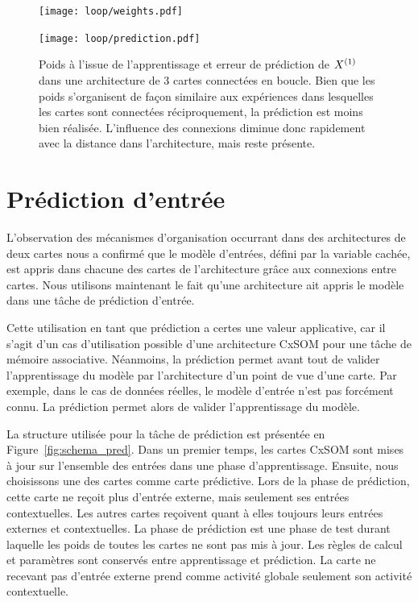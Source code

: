 \documentclass[../main]{subfiles}
\begin{document}
\begin{figure}
	\begin{minipage}{\textwidth}
		\centering\texttt{[image: loop/weights.pdf]}
	\end{minipage}
	\begin{minipage}{\textwidth}
		\texttt{[image: loop/prediction.pdf]}
		\caption{Poids à l'issue de l'apprentissage et erreur de prédiction de $X^{({1})}$ dans une architecture de 3 cartes connectées en boucle. Bien que les poids s'organisent de façon similaire aux expériences dans lesquelles les cartes sont connectées réciproquement, la prédiction est moins bien réalisée. L'influence des connexions diminue donc rapidement avec la distance dans l'architecture, mais reste présente.\label{fig:3som_loop}}
	\end{minipage}
\end{figure}

\section{Prédiction d'entrée}

L'observation des mécanismes d'organisation occurrant dans des architectures de deux cartes nous a confirmé que le modèle d'entrées, défini par la variable cachée, est appris dans chacune des cartes de l'architecture grâce aux connexions entre cartes.
Nous utilisons maintenant le fait qu'une architecture ait appris le modèle dans une tâche de prédiction d'entrée.

Cette utilisation en tant que prédiction a certes une valeur applicative, car il s'agit d'un cas d'utilisation possible d'une architecture CxSOM pour une tâche de mémoire associative. Néanmoins, la prédiction permet avant tout de valider l'apprentissage du modèle par l'architecture d'un point de vue d'une carte. Par exemple, dans le cas de données réelles, le modèle d'entrée n'est pas forcément connu. La prédiction permet alors de valider l'apprentissage du modèle.

La structure utilisée pour la tâche de prédiction est présentée en Figure~\ref{fig:schema_pred}. Dans un premier temps, les cartes CxSOM sont mises à jour sur l'ensemble des entrées dans une phase d'apprentissage. Ensuite, nous choisissons une des cartes comme carte prédictive. Lors de la phase de prédiction, cette carte ne reçoit plus d'entrée externe, mais seulement ses entrées contextuelles. 
Les autres cartes reçoivent quant à elles toujours leurs entrées externes et contextuelles. La phase de prédiction est une phase de test durant laquelle les poids de toutes les cartes ne sont pas mis à jour. Les règles de calcul et paramètres sont conservés entre apprentissage et prédiction.
La carte ne recevant pas d'entrée externe prend comme activité globale seulement son activité contextuelle.
\end{document}
